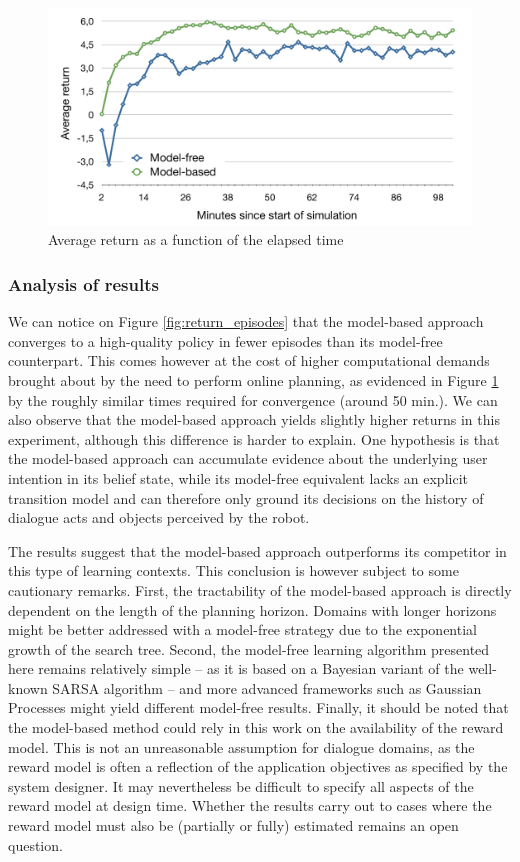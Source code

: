 \begin{figure}[p]
\centering
\includegraphics[scale=0.42]{imgs/timing.pdf}
\caption{Average return as a function of the elapsed time}
\label{fig:return_time}
\end{figure}

\subsubsection*{Analysis of results}

We can notice on Figure \ref{fig:return_episodes} that the model-based approach converges to a high-quality policy in fewer episodes than its model-free counterpart.  This comes however at the cost of higher computational demands brought about by the need to perform online planning, as evidenced in Figure \ref{fig:return_time} by the roughly similar times required for convergence (around 50 min.). We can also observe that the model-based approach yields slightly higher returns in this experiment, although this difference is harder to explain.  One hypothesis is that the model-based approach can accumulate evidence about the underlying user intention in its belief state, while its model-free equivalent lacks an explicit transition model and can therefore only ground its decisions on the history of dialogue acts and objects perceived by the robot.

The results suggest that the model-based approach outperforms its competitor in this type of learning contexts. This conclusion is however subject to some cautionary remarks.   First, the tractability of the model-based approach is directly dependent on the length of the planning horizon. Domains with longer horizons might be better addressed with a model-free strategy due to the exponential growth of the search tree. Second, the model-free learning algorithm presented here remains relatively simple -- as it is based on a Bayesian variant of the well-known SARSA algorithm -- and more advanced frameworks such as Gaussian Processes \citep{gasic2011} might yield different model-free results. Finally, it should be noted that the model-based method could rely in this work on the availability of the reward model. This is not an unreasonable assumption for dialogue domains, as the reward model is often a reflection of the application objectives as specified by the system designer. It may nevertheless be difficult to specify all aspects of the reward model at design time. Whether the results carry out to cases where the reward model must also be (partially or fully) estimated remains an open question.

